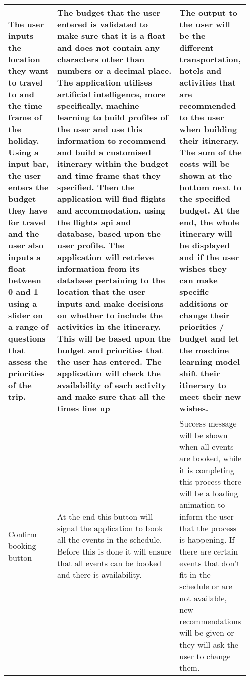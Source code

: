 \begin{longtable}{ |p{0.2\linewidth}|p{0.5\linewidth}|p{0.25\linewidth}|}
\hline
The user inputs the location they want to travel to and the time frame of the holiday. Using a input bar, the user enters the budget they have for travel and the user also inputs a float between 0 and 1 using a slider on a range of questions that assess the priorities of the trip. &  The budget that the user entered is validated to make sure that it is a float and does not contain any characters other than numbers or a decimal place. The application utilises artificial intelligence, more specifically, machine learning to build profiles of the user and use this information to recommend and build a customised itinerary within the budget and time frame that they specified. Then the application will find flights and accommodation, using the flights api and database, based upon the user profile. The application will retrieve information from its database pertaining to the location that the user inputs and make decisions on whether to include the activities in the itinerary. This will be based upon the budget and priorities that the user has entered. The application will check the availability of each activity and make sure that all the times line up & The output to the user will be the different transportation, hotels and activities that are recommended to the user when building their itinerary. The sum of the costs will be shown at the bottom next to the specified budget. At the end, the whole itinerary will be displayed and if the user wishes they can make specific additions or change their priorities / budget and let the machine learning model shift their itinerary to meet their new wishes. \\
\hline
Confirm booking button & At the end this button will signal the application to book all the events in the schedule. Before this is done it will ensure that all events can be booked and there is availability. & Success message will be shown when all events are booked, while it is completing this process there will be a loading animation to inform the user that the process is happening. If there are certain events that don't fit in the schedule or are not available, new recommendations will be given or they will ask the user to change them. \\
\hline
\end{longtable}

